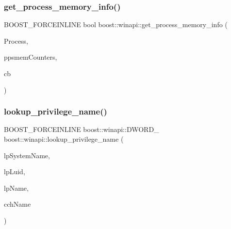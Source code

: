 \mbox{\label{namespaceboost_1_1winapi_a3edb324fb9a43e7c8ee11c5773c1f379}} 
\subsubsection{\texorpdfstring{get\+\_\+process\+\_\+memory\+\_\+info()}{get\_process\_memory\_info()}}
{\footnotesize\ttfamily B\+O\+O\+S\+T\+\_\+\+F\+O\+R\+C\+E\+I\+N\+L\+I\+NE bool boost\+::winapi\+::get\+\_\+process\+\_\+memory\+\_\+info (\begin{DoxyParamCaption}\item[{boost\+::winapi\+::\+H\+A\+N\+D\+L\+E\+\_\+}]{Process,  }\item[{\mbox{\hyperlink{namespaceboost_1_1winapi_a20b1ddfc1a2c59a32e579b39b2d28f9d}{boost\+::winapi\+::\+P\+P\+R\+O\+C\+E\+S\+S\+\_\+\+M\+E\+M\+O\+R\+Y\+\_\+\+C\+O\+U\+N\+T\+E\+R\+S\+\_\+}}}]{ppsmem\+Counters,  }\item[{boost\+::winapi\+::\+D\+W\+O\+R\+D\+\_\+}]{cb }\end{DoxyParamCaption})}

\mbox{\label{namespaceboost_1_1winapi_a04260de54170aeb1e2b06c889e5f9a15}} 
\subsubsection{\texorpdfstring{lookup\+\_\+privilege\+\_\+name()}{lookup\_privilege\_name()}\hspace{0.1cm}{\footnotesize\ttfamily [1/2]}}
{\footnotesize\ttfamily B\+O\+O\+S\+T\+\_\+\+F\+O\+R\+C\+E\+I\+N\+L\+I\+NE boost\+::winapi\+::\+D\+W\+O\+R\+D\+\_\+ boost\+::winapi\+::lookup\+\_\+privilege\+\_\+name (\begin{DoxyParamCaption}\item[{boost\+::winapi\+::\+L\+P\+C\+S\+T\+R\+\_\+}]{lp\+System\+Name,  }\item[{\mbox{\hyperlink{namespaceboost_1_1winapi_a9c163fdf2c6f3909b7d5af5652bc6727}{boost\+::winapi\+::\+P\+L\+U\+I\+D\+\_\+}}}]{lp\+Luid,  }\item[{\+\_\+\+Out\+\_\+writes\+\_\+to\+\_\+opt\+\_\+ $\ast$, $\ast$+1cch\+Display\+Name boost\+::winapi\+::\+L\+P\+S\+T\+R\+\_\+}]{lp\+Name,  }\item[{boost\+::winapi\+::\+L\+P\+D\+W\+O\+R\+D\+\_\+}]{cch\+Name }\end{DoxyParamCaption})}

